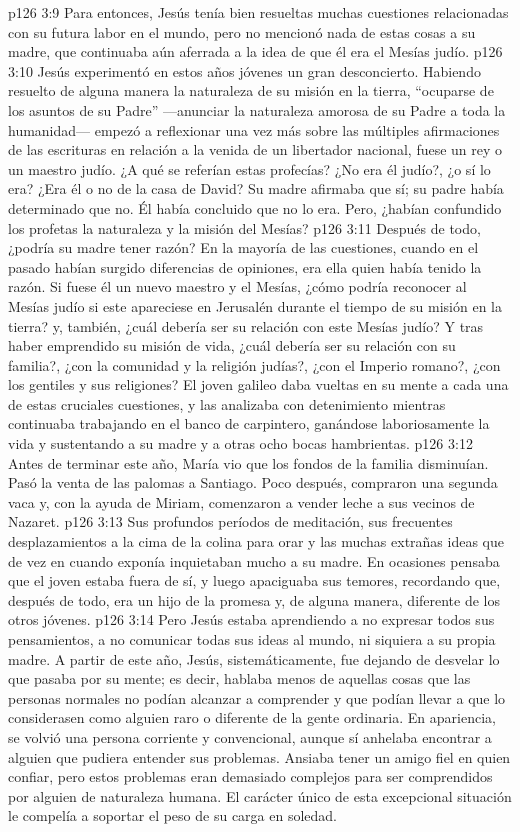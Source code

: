 \vs p126 3:9 Para entonces, Jesús tenía bien resueltas muchas cuestiones relacionadas con su futura labor en el mundo, pero no mencionó nada de estas cosas a su madre, que continuaba aún aferrada a la idea de que él era el Mesías judío.
\vs p126 3:10 Jesús experimentó en estos años jóvenes un gran desconcierto. Habiendo resuelto de alguna manera la naturaleza de su misión en la tierra, “ocuparse de los asuntos de su Padre” ---anunciar la naturaleza amorosa de su Padre a toda la humanidad--- empezó a reflexionar una vez más sobre las múltiples afirmaciones de las escrituras en relación a la venida de un libertador nacional, fuese un rey o un maestro judío. ¿A qué se referían estas profecías? ¿No era él judío?, ¿o sí lo era? ¿Era él o no de la casa de David? Su madre afirmaba que sí; su padre había determinado que no. Él había concluido que no lo era. Pero, ¿habían confundido los profetas la naturaleza y la misión del Mesías?
\vs p126 3:11 Después de todo, ¿podría su madre tener razón? En la mayoría de las cuestiones, cuando en el pasado habían surgido diferencias de opiniones, era ella quien había tenido la razón. Si fuese él un nuevo maestro y  el Mesías, ¿cómo podría reconocer al Mesías judío si este apareciese en Jerusalén durante el tiempo de su misión en la tierra? y, también, ¿cuál debería ser su relación con este Mesías judío? Y tras haber emprendido su misión de vida, ¿cuál debería ser su relación con su familia?, ¿con la comunidad y la religión judías?, ¿con el Imperio romano?, ¿con los gentiles y sus religiones? El joven galileo daba vueltas en su mente a cada una de estas cruciales cuestiones, y las analizaba con detenimiento mientras continuaba trabajando en el banco de carpintero, ganándose laboriosamente la vida y sustentando a su madre y a otras ocho bocas hambrientas.
\vs p126 3:12 \pc Antes de terminar este año, María vio que los fondos de la familia disminuían. Pasó la venta de las palomas a Santiago. Poco después, compraron una segunda vaca y, con la ayuda de Miriam, comenzaron a vender leche a sus vecinos de Nazaret.
\vs p126 3:13 \pc Sus profundos períodos de meditación, sus frecuentes desplazamientos a la cima de la colina para orar y las muchas extrañas ideas que de vez en cuando exponía inquietaban mucho a su madre. En ocasiones pensaba que el joven estaba fuera de sí, y luego apaciguaba sus temores, recordando que, después de todo, era un hijo de la promesa y, de alguna manera, diferente de los otros jóvenes.
\vs p126 3:14 Pero Jesús estaba aprendiendo a no expresar todos sus pensamientos, a no comunicar todas sus ideas al mundo, ni siquiera a su propia madre. A partir de este año, Jesús, sistemáticamente, fue dejando de desvelar lo que pasaba por su mente; es decir, hablaba menos de aquellas cosas que las personas normales no podían alcanzar a comprender y que podían llevar a que lo considerasen como alguien raro o diferente de la gente ordinaria. En apariencia, se volvió una persona corriente y convencional, aunque sí anhelaba encontrar a alguien que pudiera entender sus problemas. Ansiaba tener un amigo fiel en quien confiar, pero estos problemas eran demasiado complejos para ser comprendidos por alguien de naturaleza humana. El carácter único de esta excepcional situación le compelía a soportar el peso de su carga en soledad.
